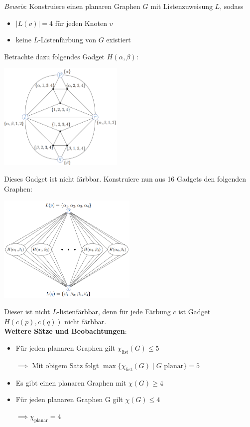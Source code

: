 \textit{Beweis}: Konstruiere einen planaren Graphen $G$ mit Listenzuweisung $L$, sodass 
\begin{itemize}
	\item $|L(v)|=4$ für jeden Knoten $v$
	\item keine $L$-Listenfärbung von $G$ existiert
\end{itemize}
Betrachte dazu folgendes Gadget $H(\alpha,\beta)$:
\begin{center}
	\includegraphics[width=0.45\textwidth]{images/lf-5.png}
\end{center}
Dieses Gadget ist nicht färbbar. Konstruiere nun aus 16 Gadgets den folgenden Graphen:
\begin{center}
	\includegraphics[width=0.5\textwidth]{images/lf-5-2.png}
\end{center}
Dieser ist nicht $L$-listenfärbbar, denn für jede Färbung $c$ ist Gadget $H(c(p),c(q))$ nicht färbbar.\\

\textbf{Weitere Sätze und Beobachtungen}:
\begin{itemize}
	\item Für jeden planaren Graphen gilt $\chi_{\text{list}}(G)\leq 5$
	
	$\implies$ Mit obigem Satz folgt $\max\{\chi_{\text{list}}(G)\mid G \text{ planar}\}=5$
	\item Es gibt einen planaren Graphen mit $\chi(G)\geq 4$
	\item Für jeden planaren Graphen G gilt $\chi(G)\leq 4$
	
	$\implies \chi_{\text{planar}}=4$ 
\end{itemize}